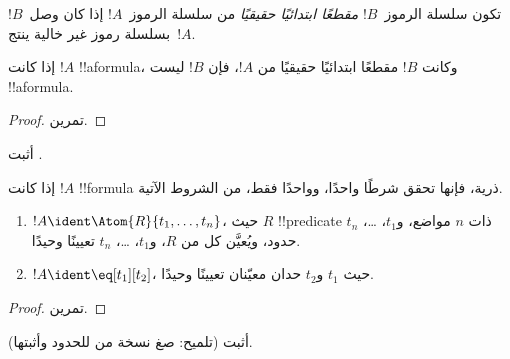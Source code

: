 \documentclass[../../../include/open-logic-section]{subfiles}
\begin{document}
\begin{defn}
تكون سلسلة الرموز~$!B$ \emph{مقطعًا ابتدائيًا حقيقيًا} من سلسلة
الرموز~$!A$ إذا كان وصل~$!B$ بسلسلة رموز غير خالية ينتج~$!A$.
\end{defn}

\begin{lem}
إذا كانت $!A$ !!a{formula}، وكانت $!B$ مقطعًا ابتدائيًا حقيقيًا من
$!A$، فإن $!B$ ليست !!a{formula}.
\end{lem}

\begin{proof}
تمرين.
\end{proof}

\begin{prob}
أثبت .
\end{prob}

\begin{prop}
إذا كانت $!A$ !!{formula} ذرية، فإنها تحقق شرطًا واحدًا، وواحدًا فقط،
من الشروط الآتية.
\begin{enumerate}
\item $!A \ident \Atom{R}{t_1,\dots,t_n}$، حيث $R$ !!{predicate}
  ذات $n$ مواضع، و$t_1$، \dots، $t_n$ حدود، ويُعيَّن كل من $R$،
  و$t_1$، \dots، $t_n$ تعيينًا وحيدًا.
\item $!A \ident \eq[t_1][t_2]$، حيث $t_1$ و$t_2$ حدان معيّنان
  تعيينًا وحيدًا.
\end{enumerate}
\end{prop}

\begin{proof}
تمرين.
\end{proof}

\begin{prob}
أثبت  (تلميح: صغ نسخة من
 للحدود وأثبتها).
\end{prob}
\end{document}
